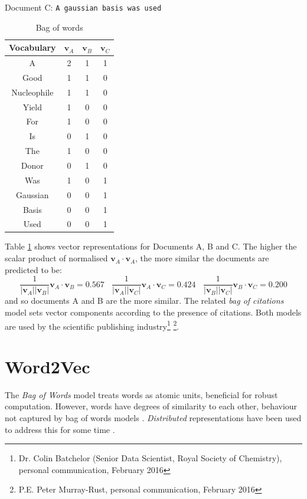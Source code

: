 Document C: \texttt{A gaussian basis was used}
\begin{table}[H]
\caption{Bag of words}
\label{tab:BAGOFWORDS}
\begin{center}
\begin{tabular}{||c|c|c|c||}
\hline
Vocabulary &  $\mathbf{v}_A$ & $\mathbf{v}_B$ & $\mathbf{v}_C$\\
\hline
A & 2 & 1 & 1\\
Good & 1 & 1 & 0\\
Nucleophile & 1 & 1 & 0 \\
Yield & 1 & 0 & 0\\
For & 1& 0 & 0\\
Is & 0 & 1 & 0\\
The & 1 & 0 & 0\\
Donor & 0 & 1 & 0\\
Was & 1 & 0 & 1\\
Gaussian & 0 & 0 & 1\\
Basis & 0 & 0 & 1\\
Used & 0 & 0 & 1\\
\hline
\end{tabular}
\end{center}
\end{table}
Table \ref{tab:BAGOFWORDS} shows vector representations for Documents A, B and C. The higher the scalar product of normalised $\mathbf{v}_A \cdot \mathbf{v}_A$, the more similar the documents are predicted to be:
 $$\frac{1}{|\mathbf{v}_A| |\mathbf{v}_B|}\mathbf{v}_A \cdot \mathbf{v}_B = 0.567 \ \ \ \ \frac{1}{|\mathbf{v}_A| |\mathbf{v}_C|}\mathbf{v}_A \cdot \mathbf{v}_C = 0.424 \ \ \ \ \frac{1}{|\mathbf{v}_B| |\mathbf{v}_C|}\mathbf{v}_B \cdot \mathbf{v}_C=0.200$$ 
and so documents A and B are the more similar.
The related \emph{bag of citations} model sets vector components according to the presence of citations. Both models are used by the scientific publishing industry\footnote{Dr. Colin Batchelor  (Senior Data Scientist, Royal Society of Chemistry), personal communication, February 2016} \footnote{P.E. Peter Murray-Rust, personal communication, February 2016}.
\section{Word2Vec}
\label{sec:WORD2VEC}
The \emph{Bag of Words} model treats words as atomic units, beneficial for robust computation. However, words have degrees of similarity to each other, behaviour not captured by bag of words models \cite{word2veckingqueen}. \emph{Distributed} representations have been used to address this for some time \cite{distributedrepresentations}.

